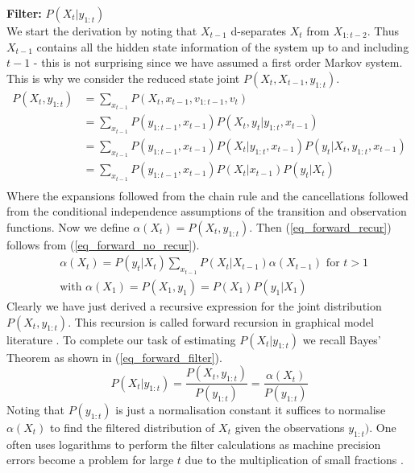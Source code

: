 \documentclass[../masters.tex]{subfiles}
\begin{document}
\textbf{Filter:} $P(X_t|y_{1:t})$\\
We start the derivation by noting that $X_{t-1}$ d-separates $X_t$ from $X_{1:t-2}$. Thus $X_{t-1}$ contains all the hidden state information of the system up to and including $t-1$ - this is not surprising since we have assumed a first order Markov system. This is why we consider the reduced state joint $P(X_t, X_{t-1},y_{1:t})$.
\begin{equation}
\begin{aligned}
P(X_t, y_{1:t}) &= \sum_{x_{t-1}} P(X_t, x_{t-1}, v_{1:t-1},v_t)\\
&= \sum_{x_{t-1}} P(y_{1:t-1}, x_{t-1})P(X_t, y_t|y_{1:t}, x_{t-1})\\  & = \sum_{x_{t-1}} P(y_{1:t-1}, x_{t-1})P(X_t|y_{1:t}, x_{t-1})P(y_t|X_t,y_{1:t}, x_{t-1}) \\
&= \sum_{x_{t-1}} P(y_{1:t-1}, x_{t-1})P(X_t|x_{t-1})P(y_t|X_t) \\
\end{aligned}
\label{eq_forward_no_recur}
\end{equation}
Where the expansions followed from the chain rule and the cancellations followed from the conditional independence assumptions of the transition and observation functions. Now we define $\alpha(X_t)=P(X_t,y_{1:t})$. Then (\ref{eq_forward_recur}) follows from (\ref{eq_forward_no_recur}).
\begin{equation}
\begin{aligned}
&\alpha(X_t) = P(y_t|X_t)\sum_{x_{t-1}}P(X_t|X_{t-1})\alpha(X_{t-1}) \text{ for } t>1\\
&\text{with } \alpha(X_1) = P(X_1, y_1) = P(X_1)P(y_1|X_1)
\end{aligned}
\label{eq_forward_recur}
\end{equation}
Clearly we have just derived a recursive expression for the joint distribution $P(X_t, y_{1:t})$. This recursion is called forward recursion in graphical model literature \cite{barber}. To complete our task of estimating $P(X_t|y_{1:t})$ we recall Bayes' Theorem as shown in (\ref{eq_forward_filter}).
\begin{equation}
P(X_t|y_{1:t}) = \frac{P(X_t, y_{1:t})}{P(y_{1:t})} = \frac{\alpha(X_t)}{P(y_{1:t})}
\label{eq_forward_filter}
\end{equation}
Noting that $P(y_{1:t})$ is just a normalisation constant it suffices to normalise $\alpha(X_t)$ to find the filtered distribution of $X_t$ given the observations $y_{1:t})$. One often uses logarithms to perform the filter calculations as machine precision errors become a problem for large $t$ due to the multiplication of small fractions \cite{barber}.
\end{document}

